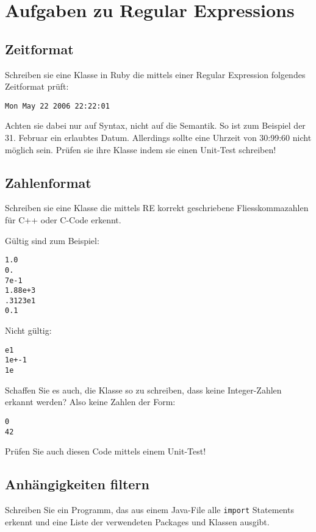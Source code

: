 \documentclass[a4paper,11pt,oneside]{scrbook}
\begin{document}
\chapter{Aufgaben zu Regular Expressions} %
\label{cha:aufgaben_zu_regular_expressions}

\section{Zeitformat} %
\label{sec:zeitformat}
Schreiben sie eine Klasse in Ruby die mittels einer Regular Expression folgendes Zeitformat prüft:

\begin{lstlisting}
Mon May 22 2006 22:22:01
\end{lstlisting}

Achten sie dabei nur auf Syntax, nicht auf die Semantik. So ist zum Beispiel der 31. Februar ein erlaubtes Datum. Allerdings sollte eine Uhrzeit von 30:99:60 nicht möglich sein.
Prüfen sie ihre Klasse indem sie einen Unit-Test schreiben!

\section{Zahlenformat} %
\label{sec:zahlenformat}
Schreiben sie eine Klasse die mittels RE korrekt geschriebene Fliesskommazahlen für C++ oder C-Code erkennt.

Gültig sind zum Beispiel:
\begin{lstlisting}
1.0
0.
7e-1
1.88e+3
.3123e1
0.1
\end{lstlisting}

Nicht gültig:
\begin{lstlisting}
e1
1e+-1
1e
\end{lstlisting}

Schaffen Sie es auch, die Klasse so zu schreiben, dass keine Integer-Zahlen erkannt werden? Also keine Zahlen der Form:
\begin{lstlisting}
0
42
\end{lstlisting}

Prüfen Sie auch diesen Code mittels einem Unit-Test!


\section{Anhängigkeiten filtern} %
\label{sec:anhängigkeiten_filtern}
Schreiben Sie ein Programm, das aus einem Java-File alle \texttt{import} Statements erkennt und eine Liste der verwendeten Packages und Klassen ausgibt.
\end{document}
